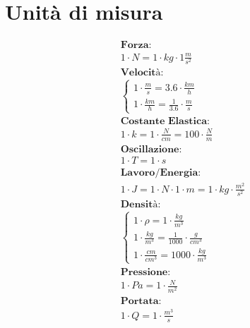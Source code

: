 \section{Unità di misura}

\begin{gather*}
  \textbf{Forza: } \\ 1 \cdot N = 1 \cdot kg \cdot 1 \frac{m}{s^2} \\
  \textbf{Velocità: } \\ \begin{cases}
    1 \cdot \frac{m}{s} = 3.6 \cdot \frac{km}{h} \\
1   \cdot \frac{km}{h} = \frac{1}{3.6} \cdot \frac{m}{s}
  \end{cases} \\
  \textbf{Costante Elastica: } \\ 1 \cdot k = 1 \cdot \frac{N}{cm} = 100 \cdot \frac{N}{m} \\
  \textbf{Oscillazione: } \\ 1 \cdot T = 1 \cdot s \\
  \textbf{Lavoro/Energia: } \\ 1 \cdot J = 1 \cdot N \cdot 1 \cdot m = 1 \cdot kg \cdot \frac{m^2}{s^2} \\
  \textbf{Densità: } \\ \begin{cases}
    1 \cdot \rho = 1 \cdot \frac{kg}{m^3} \\
    1 \cdot \frac{kg}{m^3} = \frac{1}{1000} \cdot \frac{g}{cm^3} \\
    1 \cdot \frac{cm}{cm^3} = 1000 \cdot \frac{kg}{m^3}
  \end{cases} \\
  \textbf{Pressione: } \\ 1 \cdot Pa = 1 \cdot \frac{N}{m^2} \\
  \textbf{Portata: } \\ 1 \cdot Q = 1 \cdot \frac{m^3}{s}
\end{gather*}
